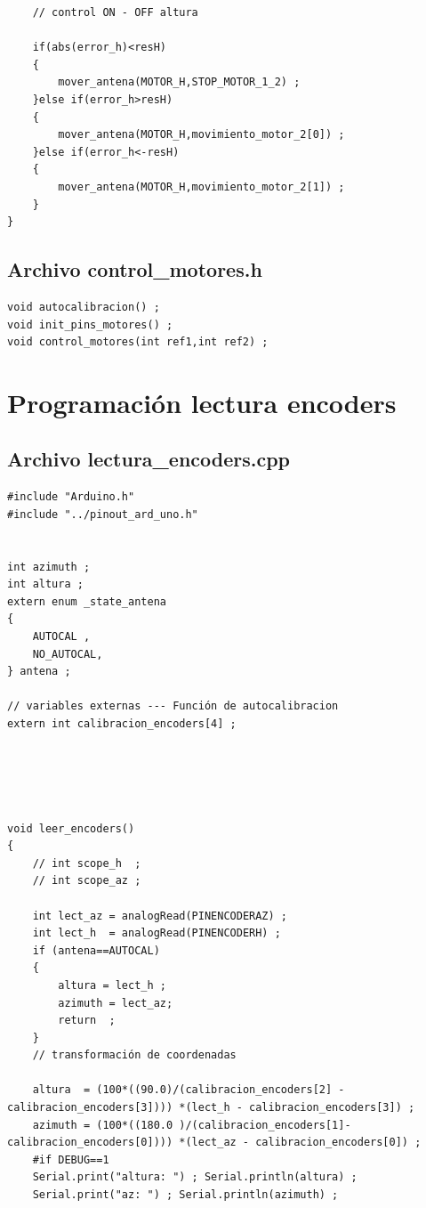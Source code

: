 \begin{appendices}
\begin{verbatim}
	// control ON - OFF altura
	
	if(abs(error_h)<resH)
	{
		mover_antena(MOTOR_H,STOP_MOTOR_1_2) ; 
	}else if(error_h>resH)
	{
		mover_antena(MOTOR_H,movimiento_motor_2[0]) ;     
	}else if(error_h<-resH)
	{ 
		mover_antena(MOTOR_H,movimiento_motor_2[1]) ; 
	} 
}

		\end{verbatim}

	\subsection{Archivo control\_motores.h} 
	

		\begin{verbatim}
void autocalibracion() ; 
void init_pins_motores() ; 
void control_motores(int ref1,int ref2) ; 
		\end{verbatim}

	
	
	\section{Programación lectura encoders} 
	\subsection{Archivo lectura\_encoders.cpp} 

		\begin{verbatim}
#include "Arduino.h" 
#include "../pinout_ard_uno.h"


int azimuth ; 
int altura ;
extern enum _state_antena 
{
	AUTOCAL ,  
	NO_AUTOCAL, 
} antena ;

// variables externas --- Función de autocalibracion  
extern int calibracion_encoders[4] ; 





void leer_encoders()
{
	// int scope_h  ; 
	// int scope_az ; 
	
	int lect_az = analogRead(PINENCODERAZ) ; 
	int lect_h  = analogRead(PINENCODERH) ; 
	if (antena==AUTOCAL) 
	{
		altura = lect_h ; 
		azimuth = lect_az; 
		return  ; 
	}
	// transformación de coordenadas 
	
	altura  = (100*((90.0)/(calibracion_encoders[2] - calibracion_encoders[3]))) *(lect_h - calibracion_encoders[3]) ; 
	azimuth = (100*((180.0 )/(calibracion_encoders[1]- calibracion_encoders[0]))) *(lect_az - calibracion_encoders[0]) ; 
	#if DEBUG==1
	Serial.print("altura: ") ; Serial.println(altura) ; 
	Serial.print("az: ") ; Serial.println(azimuth) ; 
	

\end{verbatim}
\end{appendices}

